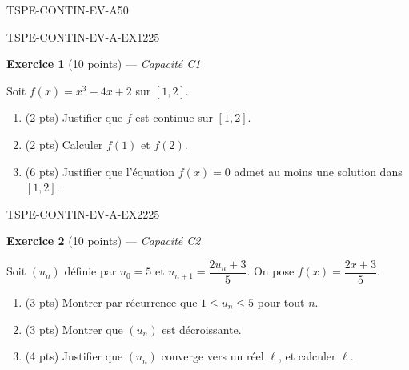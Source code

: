 \begin{evaluation}{TSPE-CONTIN-EV-A}{50}


\begin{exercice}{TSPE-CONTIN-EV-A-EX1}{2}{25}

\textbf{Exercice 1} (10 points) — \textit{Capacité C1}

\medskip

Soit $f(x) = x^3 - 4x + 2$ sur $[1, 2]$.
\begin{enumerate}
  \item (2 pts) Justifier que $f$ est continue sur $[1,2]$.
  \item (2 pts) Calculer $f(1)$ et $f(2)$.
  \item (6 pts) Justifier que l'équation $f(x) = 0$ admet au moins une solution dans $[1,2]$.
\end{enumerate}
\end{exercice}


\begin{exercice}{TSPE-CONTIN-EV-A-EX2}{2}{25}

\textbf{Exercice 2} (10 points) — \textit{Capacité C2}

\medskip

Soit $(u_n)$ définie par $u_0 = 5$ et $u_{n+1} = \dfrac{2u_n + 3}{5}$. On pose $f(x) = \dfrac{2x+3}{5}$.
\begin{enumerate}
  \item (3 pts) Montrer par récurrence que $1 \leq u_n \leq 5$ pour tout $n$.
  \item (3 pts) Montrer que $(u_n)$ est décroissante.
  \item (4 pts) Justifier que $(u_n)$ converge vers un réel $\ell$, et calculer $\ell$.
\end{enumerate}
\end{exercice}

\end{evaluation}
